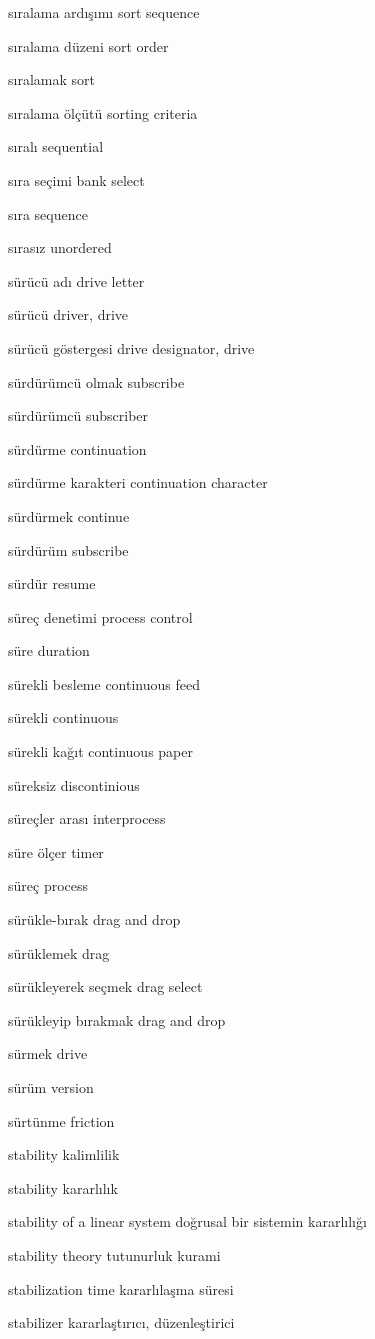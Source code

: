 \documentclass[12pt,fleqn]{article}\usepackage{../../common}
\begin{document}
sıralama ardışımı sort sequence

sıralama düzeni sort order

sıralamak sort

sıralama ölçütü sorting criteria

sıralı sequential

sıra seçimi bank select

sıra sequence

sırasız unordered

sürücü adı drive letter

sürücü driver, drive

sürücü göstergesi drive designator, drive

sürdürümcü olmak subscribe

sürdürümcü subscriber

sürdürme continuation

sürdürme karakteri continuation character

sürdürmek continue

sürdürüm subscribe

sürdür resume

süreç denetimi process control

süre duration

sürekli besleme continuous feed

sürekli continuous

sürekli kağıt continuous paper

süreksiz discontinious

süreçler arası interprocess

süre ölçer timer

süreç process

sürükle-bırak drag and drop

sürüklemek drag

sürükleyerek seçmek drag select

sürükleyip bırakmak drag and drop

sürmek drive

sürüm version

sürtünme friction

stability kalimlilik

stability kararlılık

stability of a linear system doğrusal bir sistemin kararlılığı

stability theory tutunurluk kurami

stabilization time kararlılaşma süresi

stabilizer kararlaştırıcı, düzenleştirici
\end{document}
